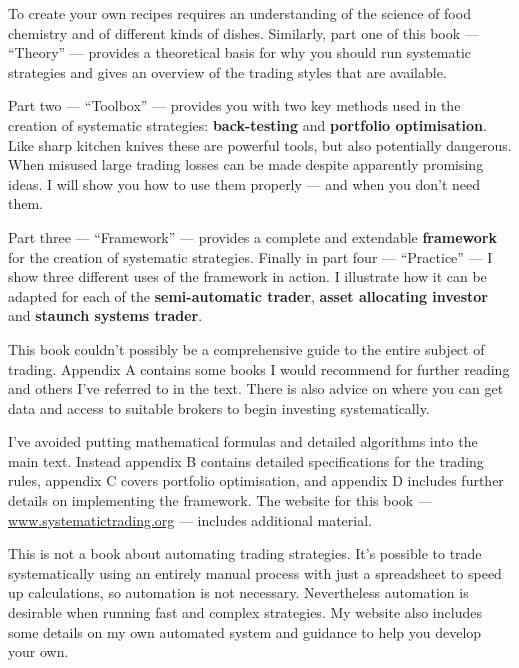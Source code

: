 To create your own recipes requires an understanding of the science of food chemistry and of different kinds of dishes. Similarly, part one of this book --- ``Theory'' --- provides a theoretical basis for why you should run systematic strategies and gives an overview of the trading styles that are available.

Part two --- ``Toolbox'' --- provides you with two key methods used in the creation of systematic strategies: \textbf{back-testing} and \textbf{portfolio optimisation}. Like sharp kitchen knives these are powerful tools, but also potentially dangerous. When misused large trading losses can be made despite apparently promising ideas. I will show you how to use them properly --- and when you don't need them.

Part three --- ``Framework'' --- provides a complete and extendable \textbf{framework} for the creation of systematic strategies. Finally in part four --- ``Practice'' --- I show three different uses of the framework in action. I illustrate how it can be adapted for each of the \textbf{semi-automatic trader}, \textbf{asset allocating investor} and \textbf{staunch systems trader}.

This book couldn't possibly be a comprehensive guide to the entire subject of trading. Appendix A contains some books I would recommend for further reading and others I've referred to in the text. There is also advice on where you can get data and access to suitable brokers to begin investing systematically.

I've avoided putting mathematical formulas and detailed algorithms into the main text. Instead appendix B contains detailed specifications for the trading rules, appendix C covers portfolio optimisation, and appendix D includes further details on implementing the framework. The website for this book --- \url{www.systematictrading.org} --- includes additional material.

This is not a book about automating trading strategies. It's possible to trade systematically using an entirely manual process with just a spreadsheet to speed up calculations, so automation is not necessary. Nevertheless automation is desirable when running fast and complex strategies. My website also includes some details on my own automated system and guidance to help you develop your own.
